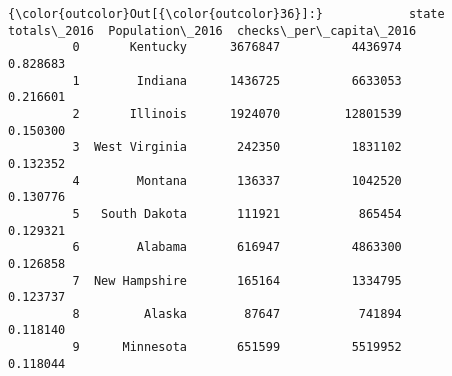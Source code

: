 \documentclass[11pt]{article}
\begin{document}
\begin{Verbatim}[commandchars=\\\{\}]
{\color{outcolor}Out[{\color{outcolor}36}]:}            state  totals\_2016  Population\_2016  checks\_per\_capita\_2016
         0       Kentucky      3676847          4436974                0.828683
         1        Indiana      1436725          6633053                0.216601
         2       Illinois      1924070         12801539                0.150300
         3  West Virginia       242350          1831102                0.132352
         4        Montana       136337          1042520                0.130776
         5   South Dakota       111921           865454                0.129321
         6        Alabama       616947          4863300                0.126858
         7  New Hampshire       165164          1334795                0.123737
         8         Alaska        87647           741894                0.118140
         9      Minnesota       651599          5519952                0.118044
\end{Verbatim}
            
\end{document}
